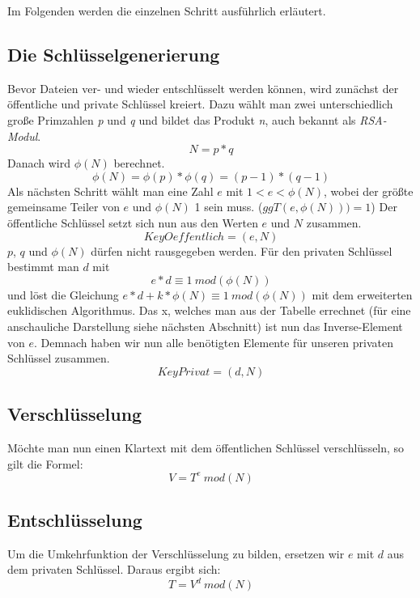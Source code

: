 Im Folgenden werden die einzelnen Schritt ausführlich erläutert.
  \subsection{Die Schlüsselgenerierung}
  Bevor Dateien ver- und wieder entschlüsselt werden können, wird zunächst der
  öffentliche und private Schlüssel kreiert. Dazu wählt man zwei
  unterschiedlich große Primzahlen \emph{p} und \emph{q} und bildet das Produkt
  \emph{n}, auch bekannt als \emph{RSA-Modul}.
  \begin{displaymath}
  N = p * q
  \end{displaymath}
  Danach wird $\phi(N)$ berechnet.
  \begin{displaymath}
  \phi(N) = \phi(p) * \phi(q) = (p-1) * (q-1)
  \end{displaymath}
  Als nächsten Schritt wählt man eine Zahl $e$ mit $1<e<\phi(N)$, wobei der
  größte gemeinsame Teiler von $e$ und $\phi(N)$ 1 sein muss. ($ggT(e,
  \phi(N)))=1$)
  Der öffentliche Schlüssel setzt sich nun aus den Werten $e$ und $N$ zusammen.
  \begin{displaymath}
  KeyOeffentlich = (e,N)
  \end{displaymath}
  $p$, $q$ und $\phi(N)$
  dürfen nicht rausgegeben werden. \newline\newline
  Für den privaten Schlüssel bestimmt man $d$ mit
  \begin{displaymath}
  e*d \equiv 1 \ mod(\phi(N))
  \end{displaymath}
  und löst die Gleichung $e*d+k*\phi(N)\equiv 1 \ mod(\phi(N))$ mit dem
  erweiterten euklidischen Algorithmus. Das x, welches man aus der Tabelle
  errechnet (für eine anschauliche Darstellung siehe nächsten Abschnitt) ist nun
  das Inverse-Element von $e$. Demnach haben wir nun alle benötigten Elemente
  für unseren privaten Schlüssel zusammen.
  \begin{displaymath}
  KeyPrivat = (d, N)
  \end{displaymath}
  \subsection{Verschlüsselung}
  Möchte man nun einen Klartext mit dem öffentlichen Schlüssel verschlüsseln, so
  gilt die Formel:
  \begin{displaymath}
  V = T^e \ mod(N)
  \end{displaymath}
  \subsection{Entschlüsselung}
  Um die Umkehrfunktion der Verschlüsselung zu bilden, ersetzen wir $e$ mit $d$
  aus dem privaten Schlüssel. Daraus ergibt sich:
  \begin{displaymath}
  T = V^d \ mod(N)
  \end{displaymath}
